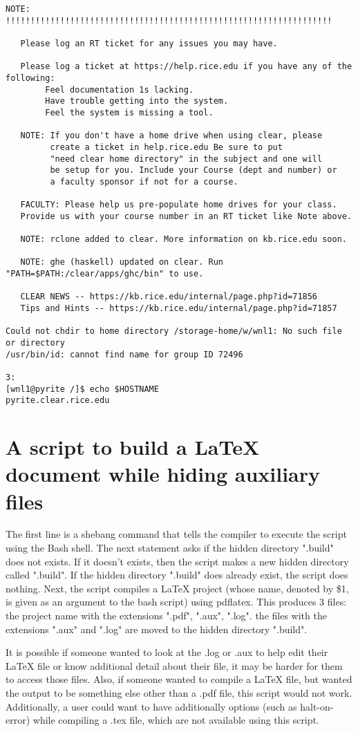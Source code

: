 \documentclass{article}
\begin{document}
\begin{verbatim}
NOTE: !!!!!!!!!!!!!!!!!!!!!!!!!!!!!!!!!!!!!!!!!!!!!!!!!!!!!!!!!!!!!!!!!!

   Please log an RT ticket for any issues you may have.

   Please log a ticket at https://help.rice.edu if you have any of the following:
        Feel documentation 1s lacking.
        Have trouble getting into the system.
        Feel the system is missing a tool.

   NOTE: If you don't have a home drive when using clear, please
         create a ticket in help.rice.edu Be sure to put
         "need clear home directory" in the subject and one will
         be setup for you. Include your Course (dept and number) or
         a faculty sponsor if not for a course.

   FACULTY: Please help us pre-populate home drives for your class.
   Provide us with your course number in an RT ticket like Note above.

   NOTE: rclone added to clear. More information on kb.rice.edu soon.

   NOTE: ghe (haskell) updated on clear. Run "PATH=$PATH:/clear/apps/ghc/bin" to use.

   CLEAR NEWS -- https://kb.rice.edu/internal/page.php?id=71856
   Tips and Hints -- https://kb.rice.edu/internal/page.php?id=71857

Could not chdir to home directory /storage-home/w/wnl1: No such file or directory
/usr/bin/id: cannot find name for group ID 72496

3:
[wnl1@pyrite /]$ echo $HOSTNAME
pyrite.clear.rice.edu
\end{verbatim}

\section{A script to build a LaTeX document while hiding auxiliary files}


The first line is a shebang command that tells the compiler to execute the script using the Bash shell. The next statement asks if the hidden directory ".build" does not exists. If it doesn't exists, then the script makes a new hidden directory called ".build". If the hidden directory ".build" does already exist, the script does nothing. Next, the script compiles a LaTeX project (whose name, denoted by \$1,  is given as an argument to the bash script) using pdflatex. This produces 3 files: the project name with the extensions ".pdf", ".aux", ".log". the files with the extensions ".aux" and ".log" are moved to the hidden directory ".build".

It is possible if someone wanted to look at the .log or .aux to help edit their LaTeX file or know additional detail about their file, it may be harder for them to access those files. Also,  if someone wanted to compile a LaTeX file, but wanted the output to be something else other than a .pdf file, this script would not work. Additionally, a user could want to have additionally options (such as halt-on-error) while compiling a .tex file, which are not available using this script.
\end{document}
